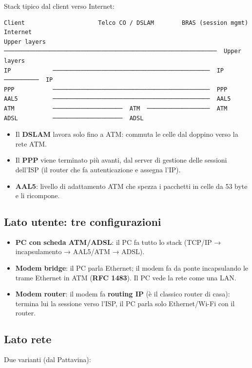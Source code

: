 Stack tipico dal client verso Internet:

\begin{verbatim}
Client                     Telco CO / DSLAM        BRAS (session mgmt)     Internet
Upper layers  ─────────────────────────────────────────────────────────────  Upper layers
IP            ─────────────────────────────────────────────  IP  ──────────  IP
PPP           ─────────────────────────────────────────────  PPP
AAL5          ─────────────────────────────────────────────  AAL5
ATM           ────────────────────  ATM  ──────────────────  ATM
ADSL          ────────────────────  ADSL
\end{verbatim}

\begin{itemize}
\tightlist
\item
  Il \textbf{DSLAM} lavora solo fino a ATM: commuta le celle dal doppino verso la rete ATM.
\item
  Il \textbf{PPP} viene terminato più avanti, dal server di gestione delle sessioni dell'ISP (il router che fa autenticazione e assegna l'IP).
\item
  \textbf{AAL5}: livello di adattamento ATM che spezza i pacchetti in celle da 53 byte e li ricompone.
\end{itemize}

\subsection{Lato utente: tre configurazioni}

\begin{itemize}
\tightlist
\item
  \textbf{PC con scheda ATM/ADSL}: il PC fa tutto lo stack (TCP/IP → incapsulamento → AAL5/ATM → ADSL).
\item
  \textbf{Modem bridge}: il PC parla Ethernet; il modem fa da ponte incapsulando le trame Ethernet in ATM (\textbf{RFC 1483}). Il PC vede la rete come una LAN.
\item
  \textbf{Modem router}: il modem fa \textbf{routing IP} (è il classico router di casa): termina lui la sessione verso l'ISP, il PC parla solo Ethernet/Wi-Fi con il router.
\end{itemize}

\subsection{Lato rete}

Due varianti (dal Pattavina):

